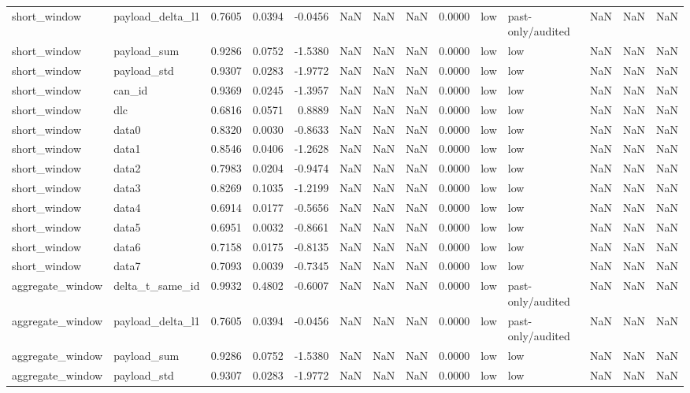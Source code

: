 \begin{tabular}{llrrrrrrrllrrr}
short_window & payload_delta_l1 & 0.7605 & 0.0394 & -0.0456 & NaN & NaN & NaN & 0.0000 & low & past-only/audited & NaN & NaN & NaN \\
short_window & payload_sum & 0.9286 & 0.0752 & -1.5380 & NaN & NaN & NaN & 0.0000 & low & low & NaN & NaN & NaN \\
short_window & payload_std & 0.9307 & 0.0283 & -1.9772 & NaN & NaN & NaN & 0.0000 & low & low & NaN & NaN & NaN \\
short_window & can_id & 0.9369 & 0.0245 & -1.3957 & NaN & NaN & NaN & 0.0000 & low & low & NaN & NaN & NaN \\
short_window & dlc & 0.6816 & 0.0571 & 0.8889 & NaN & NaN & NaN & 0.0000 & low & low & NaN & NaN & NaN \\
short_window & data0 & 0.8320 & 0.0030 & -0.8633 & NaN & NaN & NaN & 0.0000 & low & low & NaN & NaN & NaN \\
short_window & data1 & 0.8546 & 0.0406 & -1.2628 & NaN & NaN & NaN & 0.0000 & low & low & NaN & NaN & NaN \\
short_window & data2 & 0.7983 & 0.0204 & -0.9474 & NaN & NaN & NaN & 0.0000 & low & low & NaN & NaN & NaN \\
short_window & data3 & 0.8269 & 0.1035 & -1.2199 & NaN & NaN & NaN & 0.0000 & low & low & NaN & NaN & NaN \\
short_window & data4 & 0.6914 & 0.0177 & -0.5656 & NaN & NaN & NaN & 0.0000 & low & low & NaN & NaN & NaN \\
short_window & data5 & 0.6951 & 0.0032 & -0.8661 & NaN & NaN & NaN & 0.0000 & low & low & NaN & NaN & NaN \\
short_window & data6 & 0.7158 & 0.0175 & -0.8135 & NaN & NaN & NaN & 0.0000 & low & low & NaN & NaN & NaN \\
short_window & data7 & 0.7093 & 0.0039 & -0.7345 & NaN & NaN & NaN & 0.0000 & low & low & NaN & NaN & NaN \\
aggregate_window & delta_t_same_id & 0.9932 & 0.4802 & -0.6007 & NaN & NaN & NaN & 0.0000 & low & past-only/audited & NaN & NaN & NaN \\
aggregate_window & payload_delta_l1 & 0.7605 & 0.0394 & -0.0456 & NaN & NaN & NaN & 0.0000 & low & past-only/audited & NaN & NaN & NaN \\
aggregate_window & payload_sum & 0.9286 & 0.0752 & -1.5380 & NaN & NaN & NaN & 0.0000 & low & low & NaN & NaN & NaN \\
aggregate_window & payload_std & 0.9307 & 0.0283 & -1.9772 & NaN & NaN & NaN & 0.0000 & low & low & NaN & NaN & NaN \\

\end{tabular}
